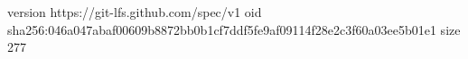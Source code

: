 version https://git-lfs.github.com/spec/v1
oid sha256:046a047abaf00609b8872bb0b1cf7ddf5fe9af09114f28e2c3f60a03ee5b01e1
size 277
